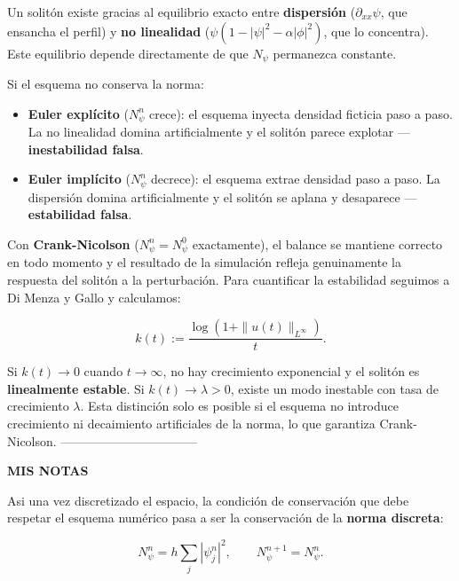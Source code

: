 \documentclass[letterpaper,11pt]{exam}
\theoremstyle{plain}
\begin{document}
Un solitón existe gracias al equilibrio exacto entre 
\textbf{dispersión} ($\partial_{xx}\psi$, que ensancha el 
perfil) y \textbf{no linealidad} ($\psi(1-|\psi|^2-
\alpha|\phi|^2)$, que lo concentra). Este equilibrio 
depende directamente de que $N_\psi$ permanezca constante.

Si el esquema no conserva la norma:

\begin{itemize}
    \item \textbf{Euler explícito} ($N_\psi^n$ crece): el 
    esquema inyecta densidad ficticia paso a paso. La no 
    linealidad domina artificialmente y el solitón parece 
    explotar — \textbf{inestabilidad falsa}.
    \item \textbf{Euler implícito} ($N_\psi^n$ decrece): 
    el esquema extrae densidad paso a paso. La dispersión 
    domina artificialmente y el solitón se aplana y 
    desaparece — \textbf{estabilidad falsa}.
\end{itemize}

Con \textbf{Crank-Nicolson} ($N_\psi^n = N_\psi^0$ 
exactamente), el balance se mantiene correcto en todo 
momento y el resultado de la simulación refleja 
genuinamente la respuesta del solitón a la perturbación. 
Para cuantificar la estabilidad seguimos a Di Menza y 
Gallo y calculamos:

\begin{equation}
    k(t) := \frac{\log(1+\|u(t)\|_{L^\infty})}{t}.
\end{equation}

Si $k(t)\to 0$ cuando $t\to\infty$, no hay crecimiento 
exponencial y el solitón es \textbf{linealmente estable}. 
Si $k(t)\to\lambda>0$, existe un modo inestable con tasa 
de crecimiento $\lambda$. Esta distinción solo es posible 
si el esquema no introduce crecimiento ni decaimiento 
artificiales de la norma, lo que garantiza Crank-Nicolson.
---------------------------------

\textbf{MIS NOTAS}

 Asi una vez discretizado el espacio, la condición de conservación que debe 
respetar el esquema numérico pasa a ser la conservación de la 
\textbf{norma discreta}:

\begin{equation}
    N_\psi^n = h\sum_j|\psi_j^n|^2, \qquad 
    N_\psi^{n+1} = N_\psi^n.
\end{equation}
\end{document}
